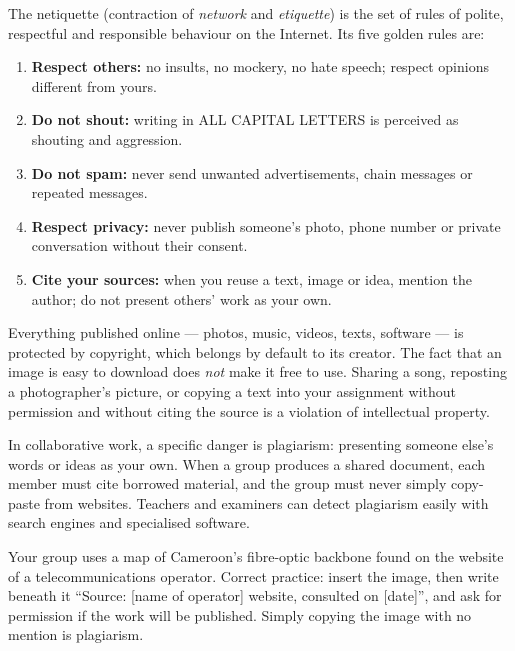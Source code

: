 \documentclass[11pt]{article}
\newcommand{\cle}[1]{{\popxbold\color{popdark}#1}}
\newcounter{popsec}
\newcounter{popsub}
\newcommand{\courssub}[1]{%
  \stepcounter{popsub}%
  \par\vspace{9pt}\noindent{\popxbold\fontsize{11.5}{13}\selectfont\color{popink}{\color{poporange}\thepopsec.\thepopsub}\hspace{6pt}#1}\par\nopagebreak\vspace{4pt}
}
\begin{document}
\begin{definition}
The \cle{netiquette} (contraction of \emph{network} and \emph{etiquette}) is the set of rules of polite, respectful and responsible behaviour on the Internet. Its five golden rules are:
\begin{enumerate}
\item \textbf{Respect others:} no insults, no mockery, no hate speech; respect opinions different from yours.
\item \textbf{Do not shout:} writing in ALL CAPITAL LETTERS is perceived as shouting and aggression.
\item \textbf{Do not spam:} never send unwanted advertisements, chain messages or repeated messages.
\item \textbf{Respect privacy:} never publish someone's photo, phone number or private conversation without their consent.
\item \textbf{Cite your sources:} when you reuse a text, image or idea, mention the author; do not present others' work as your own.
\end{enumerate}
\end{definition}

\courssub{Intellectual property online}

Everything published online --- photos, music, videos, texts, software --- is protected by \cle{copyright}, which belongs by default to its creator. The fact that an image is easy to download does \emph{not} make it free to use. Sharing a song, reposting a photographer's picture, or copying a text into your assignment without permission and without citing the source is a violation of intellectual property.

In collaborative work, a specific danger is \cle{plagiarism}: presenting someone else's words or ideas as your own. When a group produces a shared document, each member must cite borrowed material, and the group must never simply copy-paste from websites. Teachers and examiners can detect plagiarism easily with search engines and specialised software.

\begin{exemplebox}
Your group uses a map of Cameroon's fibre-optic backbone found on the website of a telecommunications operator. Correct practice: insert the image, then write beneath it ``Source: [name of operator] website, consulted on [date]'', and ask for permission if the work will be published. Simply copying the image with no mention is plagiarism.
\end{exemplebox}
\end{document}
